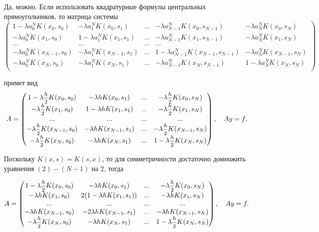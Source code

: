 \documentclass[12pt, a4paper]{article}
\begin{document}
\begin{enumerate}
Да, можно. Если использовать квадратурные формулы центральных прямоугольников, то матрица системы 
\noindent \[ 
\begin{pmatrix}
1 - \lambda a_0^N K(x_0,s_0)  &    - \lambda a_1^N K(x_0,s_1)   &  ...  &   - \lambda a_{N-1}^N K(x_0,s_{N-1})&   - \lambda a_N^N K(x_0,s_N)  \\
-\lambda a_0^N K(x_1,s_0)  &   1 - \lambda a_1^N K(x_1,s_1)   &  ...  &   - \lambda a_{N-1}^N K(x_1,s_{N-1})&   - \lambda a_N^N K(x_1,s_N)  \\
... &   ...   &  ...  &   ...  \\
-\lambda a_0^N K(x_{N-1},s_0)  &    - \lambda a_1^N K(x_{N-1},s_1)   &  ...  &  1 - \lambda a_{N-1}^N K(x_{N-1},s_{N-1})&  -\lambda a_N^N K(x_{N-1},s_N) \\
-\lambda a_0^N K(x_N,s_0)  &    - \lambda a_1^N K(x_N,s_1)   &  ... &-\lambda a_{N-1}^N K(x_{N},s_{N-1}) &  1 - \lambda a_N^N K(x_N,s_N) \\
\end{pmatrix} 
\]

примет вид
\[A=
        \begin{pmatrix}
            1 - \lambda \hbox{\footnotesize$\displaystyle\frac{h}{2}$} K(x_0,s_0)  &    - \lambda h K(x_0,s_1)   &  ...  &   - \lambda \hbox{\footnotesize$\displaystyle\frac{h}{2}$} K(x_0,s_N)  \\
             -\lambda \hbox{\footnotesize$\displaystyle\frac{h}{2}$} K(x_1,s_0)  &   1 - \lambda h K(x_1,s_1)   &  ...  &   - \lambda \hbox{\footnotesize$\displaystyle\frac{h}{2}$} K(x_1,s_N)  \\
            ... &   ...   &  ...  &   ...  \\
 	  -\lambda \hbox{\footnotesize$\displaystyle\frac{h}{2}$} K(x_{N-1},s_0)  &    - \lambda h K(x_{N-1},s_1)   &  ...  &  - \lambda \hbox{\footnotesize$\displaystyle\frac{h}{2}$} K(x_{N-1},s_N) \\
            -\lambda \hbox{\footnotesize$\displaystyle\frac{h}{2}$} K(x_N,s_0)  &    - \lambda h K(x_N,s_1)   &  ...  &  1 - \lambda \hbox{\footnotesize$\displaystyle\frac{h}{2}$} K(x_N,s_N) \\
        \end{pmatrix}, \quad Ay = f.
    \]

Поскольку $K(x,s) = K(s,x)$, то для симметричности достаточно домножить уравнения $(2)-(N-1)$ на 2, тогда 

\[A=
        \begin{pmatrix}
            1 - \lambda \hbox{\footnotesize$\displaystyle\frac{h}{2}$} K(x_0,s_0)  &    - \lambda h K(x_0,s_1)   &  ...  &   - \lambda \hbox{\footnotesize$\displaystyle\frac{h}{2}$} K(x_0,s_N)  \\
             -\lambda  h K(x_1,s_0)  &  2( 1 - \lambda h K(x_1,s_1))   &  ...  &   - \lambda h K(x_1,s_N)  \\
            ... &   ...   &  ...  &   ...  \\
 	  -\lambda h K(x_{N-1},s_0)  &    - 2\lambda h K(x_{N-1},s_1)   &  ...  & - \lambda h K(x_{N-1},s_N) \\
            -\lambda \hbox{\footnotesize$\displaystyle\frac{h}{2}$} K(x_N,s_0)  &    - \lambda h K(x_N,s_1)   &  ...  &  1 - \lambda \hbox{\footnotesize$\displaystyle\frac{h}{2}$} K(x_N,s_N) \\
        \end{pmatrix}, \quad Ay = f.
    \]



\end{enumerate}
\end{document}
